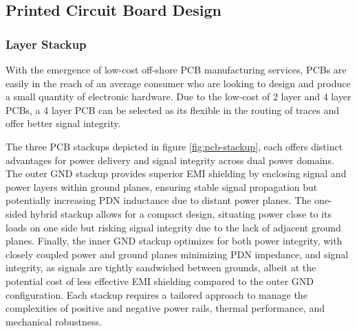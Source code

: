 \documentclass[10pt]{article}
\begin{document}
\begin{multicols*}{2}
            \subsection{Printed Circuit Board Design}

                \subsubsection{Layer Stackup}
                    With the emergence of low-cost off-shore PCB manufacturing services, PCBs are easily in the reach of an average consumer who are looking to design and produce a small quantity of electronic hardware. Due to the low-cost of 2 layer and 4 layer PCBs, a 4 layer PCB can be selected as its flexible in the routing of traces and offer better signal integrity.\par
                    The three PCB stackups depicted in figure \ref{fig:pcb-stackup}, each offers distinct advantages for power delivery and signal integrity across dual power domains. The outer GND stackup provides superior EMI shielding by enclosing signal and power layers within ground planes, ensuring stable signal propagation but potentially increasing PDN inductance due to distant power planes. The one-sided hybrid stackup allows for a compact design, situating power close to its loads on one side but risking signal integrity due to the lack of adjacent ground planes. Finally, the inner GND stackup optimizes for both power integrity, with closely coupled power and ground planes minimizing PDN impedance, and signal integrity, as signals are tightly sandwiched between grounds, albeit at the potential cost of less effective EMI shielding compared to the outer GND configuration. Each stackup requires a tailored approach to manage the complexities of positive and negative power rails, thermal performance, and mechanical robustness.

                    \begin{figure}[ht]

                        \centering

                        \begin{subfigure}[b]{0.3333\linewidth}
                            \centering
\end{subfigure}
\end{figure}
\end{multicols*}
\end{document}
